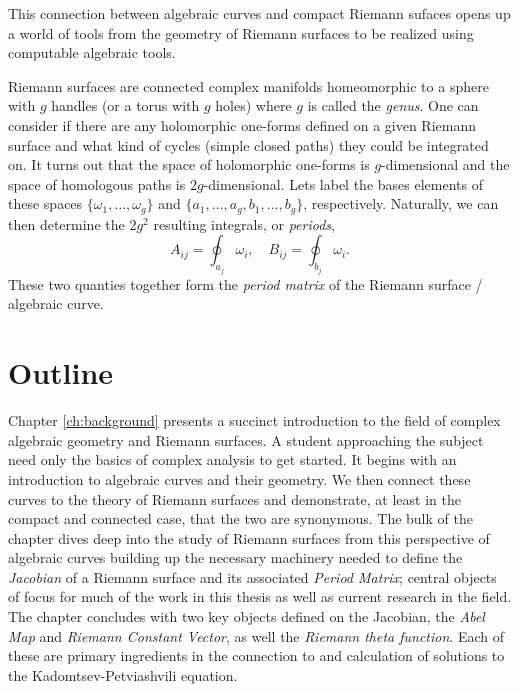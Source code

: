 This connection between algebraic curves and compact Riemann sufaces opens up a
world of tools from the geometry of Riemann surfaces to be realized using
computable algebraic tools.

Riemann surfaces are connected complex manifolds homeomorphic to a sphere with
$g$ handles (or a torus with $g$ holes) where $g$ is called the {\it genus}. One
can consider if there are any holomorphic one-forms defined on a given Riemann
surface and what kind of cycles (simple closed paths) they could be integrated
on. It turns out that the space of holomorphic one-forms is $g$-dimensional and
the space of homologous paths is $2g$-dimensional. Lets label the bases elements
of these spaces $\{\omega_1, \ldots, \omega_g\}$ and $\{ a_1, \ldots, a_g,
b_1, \ldots, b_g\}$, respectively. Naturally, we can then determine the $2g^2$
resulting integrals, or {\it periods},
\begin{equation}
  A_{ij} = \oint_{a_j} \omega_i, \quad B_{ij} = \oint_{b_j} \omega_i.
\end{equation}
These two quanties together form the {\it period matrix} of the Riemann surface
/ algebraic curve.






\section{Outline} \label{sec:outline}

Chapter \ref{ch:background} presents a succinct introduction to the field of
complex algebraic geometry and Riemann surfaces. A student approaching the
subject need only the basics of complex analysis to get started. It begins with
an introduction to algebraic curves and their geometry. We then connect these
curves to the theory of Riemann surfaces and demonstrate, at least in the
compact and connected case, that the two are synonymous. The bulk of the chapter
dives deep into the study of Riemann surfaces from this perspective of algebraic
curves building up the necessary machinery needed to define the {\it Jacobian}
of a Riemann surface and its associated {\it Period Matrix}; central objects of
focus for much of the work in this thesis as well as current research in the
field. The chapter concludes with two key objects defined on the Jacobian, the
{\it Abel Map} and {\it Riemann Constant Vector}, as well the {\it Riemann theta
  function}. Each of these are primary ingredients in the connection to and
calculation of solutions to the Kadomtsev-Petviashvili equation.

